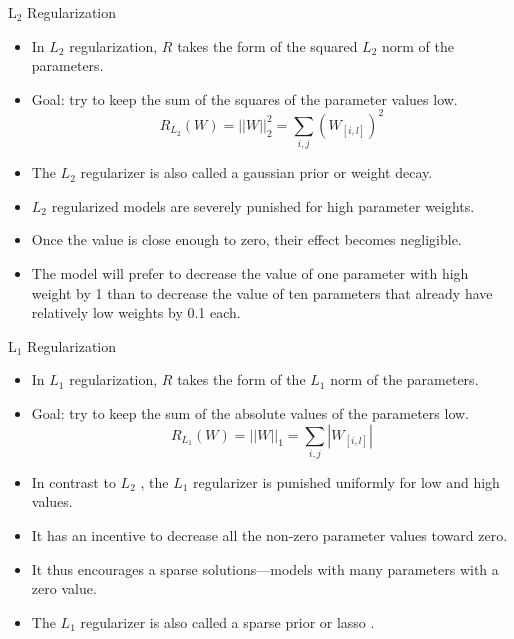 \documentclass[handout]{beamer}
\begin{document}
\begin{frame}{L$_2$ Regularization}
\begin{scriptsize}
\begin{itemize}
\item  In $L_2$ regularization, $R$ takes the form of the squared $L_2$ norm of the parameters.
\item Goal: try to keep the sum of the squares of the parameter values low.
  \begin{displaymath}
   R_{L_{2}}(W) = ||W||^{2}_{2} = \sum_{i,j}(W_{[i,l]})^2
  \end{displaymath}
\item The $L_2$ regularizer is also called a gaussian prior or weight decay.
\item $L_2$ regularized models are severely punished for high parameter weights.
\item Once the value is close enough to zero, their effect becomes negligible.
\item The model will prefer to decrease the value of one parameter with high weight by 1 than to decrease the value of ten parameters that already have relatively low weights by 0.1 each.
\end{itemize}
\end{scriptsize}

\end{frame}



\begin{frame}{L$_1$ Regularization}
\begin{scriptsize}
\begin{itemize}
  \item  In $L_1$ regularization, $R$ takes the form of the $L_1$ norm of the parameters.
  \item Goal: try to keep the sum of the absolute values of the parameters low.
  \begin{displaymath}
   R_{L_{1}}(W) = ||W||_{1} = \sum_{i,j} |W_{[i,l]}|
  \end{displaymath}
 \item In contrast to $L_2$ , the $L_1$ regularizer is punished uniformly for low and high values.
 \item It has an incentive to decrease all the non-zero parameter values toward zero. 
 \item It thus encourages a sparse solutions—models with many parameters with a zero value. 
 \item The $L_1$ regularizer is also called a sparse prior or lasso \cite{tibshirani1996regression}. 
  \end{itemize}
\end{scriptsize}

\end{frame}
\end{document}
